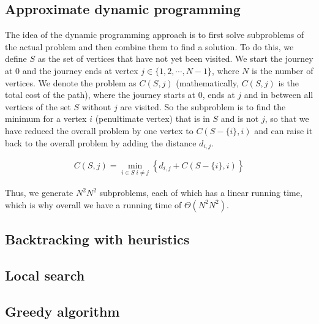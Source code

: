 \subsection{Approximate dynamic programming}

The idea of the dynamic programming approach is to first solve subproblems of the actual problem and then combine them to find a solution. To do this, we define $S$ as the set of vertices that have not yet been visited. We start the journey at 0 and the journey ends at vertex $j\in\{1,2,\cdots,N-1\}$, where $N$ is the number of vertices. We denote the problem as $C(S,j)$ (mathematically, $C(S,j)$ is the total cost of the path), where the journey starts at 0, ends at $j$ and in between all vertices of the set $S$ without $j$ are visited. So the subproblem is to find the minimum for a vertex $i$ (penultimate vertex) that is in $S$ and is not $j$, so that we have reduced the overall problem by one vertex to $C(S-\{i\},i)$ and can raise it back to the overall problem by adding the distance $d_{i,j}$.

\begin{align}
    C(S,j)=\min_{i\in S\;i\neq j}\left\{d_{i,j}+C(S-\{i\},i)\right\}
\end{align}

Thus, we generate $N^2N^2$ subproblems, each of which has a linear running time, which is why overall we have a running time of $\Theta(N^2N^2)$.

%

\subsection{Backtracking with heuristics}

%

\subsection{Local search}

%

\subsection{Greedy algorithm}

%